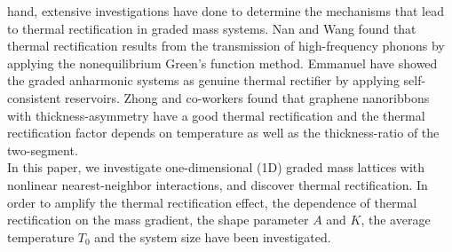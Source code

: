 \documentclass[pra,preprint,superscriptaddress,showkeys,showpacs]{revtex4}
\begin{document}
hand, extensive investigations have done to determine the mechanisms
that lead to thermal rectification in graded mass systems. Nan and
Wang found that thermal rectification results from the transmission
of high-frequency phonons by applying the nonequilibrium Green's
function method\cite{a24}. Emmanuel have showed the graded
anharmonic systems as genuine thermal
rectifier by applying self-consistent reservoirs\cite{a22}. Zhong and co-workers \cite{a25} found that graphene nanoribbons with thickness-asymmetry have a good thermal rectification and the thermal rectification factor depends on temperature as well as the thickness-ratio of the
two-segment.\\
\indent In this paper, we investigate one-dimensional (1D) graded
mass lattices with nonlinear nearest-neighbor interactions, and
discover thermal rectification. In order to amplify the thermal
rectification effect, the dependence of thermal rectification on the
mass gradient, the shape parameter $A$ and $K$, the average
temperature $T_{0}$ and the system size have been investigated.
\end{document}
